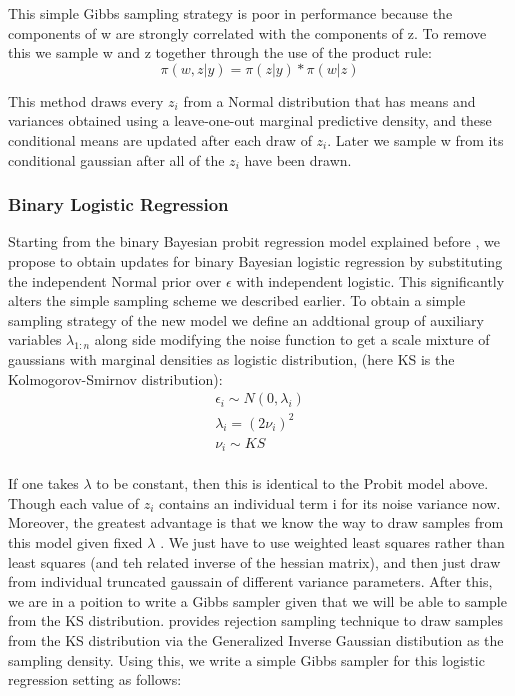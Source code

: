 This simple Gibbs sampling strategy is poor in performance because the
components of w are strongly correlated with the components of z. To remove this
we sample w and z together through the use of the product rule:
\begin{equation}
\pi(w,z|y) = \pi(z|y)*\pi(w|z)
\end{equation}

This method draws every $z_i$ from a Normal distribution that has means
and variances obtained using a leave-one-out marginal predictive density,
and these conditional means are updated after each draw of $z_i$.
Later we sample w from its conditional gaussian after all of the
$z_i$ have been drawn. 

\subsubsection{Binary Logistic Regression}
Starting from the binary Bayesian probit regression model explained before , we
propose to obtain updates for binary Bayesian logistic regression by
substituting the independent Normal 
prior over $\epsilon$ with independent logistic. 
This significantly alters the simple sampling scheme we described earlier. To
obtain a simple sampling strategy of the new model we define an addtional group
of auxiliary variables $λ_{1:n}$ along side modifying the noise function to get
a scale mixture of gaussians with marginal densities as logistic distribution,
(here KS is the Kolmogorov-Smirnov distribution):
\begin{eqnarray}
\epsilon_i \sim N(0,\lambda_i) \\
\lambda_i = (2\nu_i)^2 \\
\nu_i \sim KS \\
\end{eqnarray}

If one takes $\lambda$ to be  constant, then this is identical to the
Probit model above. Though each value of $z_i$ contains an individual term i for
its noise variance now. Moreover, the greatest advantage is that we know the way
to draw samples from this model given fixed $\lambda$ . We just have to use
weighted least squares rather than least squares (and teh related inverse of the 
hessian matrix), and then just draw from individual truncated gaussain of
different variance parameters. After this, we are in a poition to write a
Gibbs sampler given that we will be able to sample from the KS distribution.
\cite{Holmes} provides rejection sampling technique to draw samples 
from the KS distribution via the Generalized Inverse Gaussian distibution as the
sampling density. Using this, we write a simple Gibbs sampler for this
logistic regression setting as follows:

